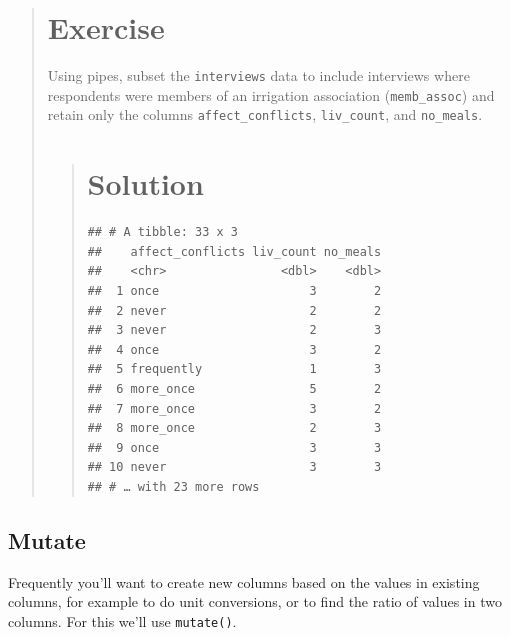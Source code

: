 \documentclass[]{book}
\newenvironment{Shaded}{\begin{snugshade}}{\end{snugshade}}
\newcommand{\KeywordTok}[1]{\textcolor[rgb]{0.13,0.29,0.53}{\textbf{#1}}}
\newcommand{\StringTok}[1]{\textcolor[rgb]{0.31,0.60,0.02}{#1}}
\newcommand{\OperatorTok}[1]{\textcolor[rgb]{0.81,0.36,0.00}{\textbf{#1}}}
\newcommand{\NormalTok}[1]{#1}
\begin{document}
\begin{quote}
\section{Exercise}\label{exercise-5}

Using pipes, subset the \texttt{interviews} data to include interviews
where respondents were members of an irrigation association
(\texttt{memb\_assoc}) and retain only the columns
\texttt{affect\_conflicts}, \texttt{liv\_count}, and \texttt{no\_meals}.

\begin{quote}
\section{Solution}\label{solution-4}

\begin{Shaded}
\end{Shaded}

\begin{verbatim}
## # A tibble: 33 x 3
##    affect_conflicts liv_count no_meals
##    <chr>                <dbl>    <dbl>
##  1 once                     3        2
##  2 never                    2        2
##  3 never                    2        3
##  4 once                     3        2
##  5 frequently               1        3
##  6 more_once                5        2
##  7 more_once                3        2
##  8 more_once                2        3
##  9 once                     3        3
## 10 never                    3        3
## # … with 23 more rows
\end{verbatim}
\end{quote}
\end{quote}

\subsection{Mutate}\label{mutate}

Frequently you'll want to create new columns based on the values in
existing columns, for example to do unit conversions, or to find the
ratio of values in two columns. For this we'll use \texttt{mutate()}.
\end{document}
